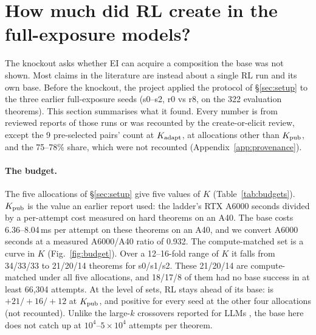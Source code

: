\section{How much did RL create in the full-exposure models?}
\label{sec:case}

The knockout asks whether EI can acquire a composition the base was not shown. Most claims in the literature are
instead about a single RL run and its own base. Before the knockout, the project applied the protocol of
\S\ref{sec:setup} to the three earlier full-exposure seeds (s0--s2, r0 vs r8, on the 322 evaluation theorems). This
section summarises what it found. Every number is from reviewed reports of those runs or was recounted by the
create-or-elicit review, except the 9 pre-selected pairs' count at $K_{\mathrm{adapt}}$, \dcov{} at allocations other than
$K_{\mathrm{pub}}$, and the 75--78\% share, which were not recounted (Appendix~\ref{app:provenance}).

\paragraph{The budget.} The five allocations of \S\ref{sec:setup} give five values of $K$ (Table~\ref{tab:budgets}).
$K_{\mathrm{pub}}$ is the value an earlier report used: the ladder's RTX A6000 seconds divided by a per-attempt cost measured on
hard theorems on an A40. The base costs 6.36--8.04\,ms per attempt on these theorems on an A40, and we convert A6000 seconds at a
measured A6000/A40 ratio of 0.932. The compute-matched set is a curve in $K$ (Fig.~\ref{fig:budget}). Over a 12--16-fold
range of $K$ it falls from 34/33/33 to 21/20/14 theorems for s0/s1/s2. These 21/20/14 are compute-matched under all five
allocations, and 18/17/8 of them had no base success in at least 66,304 attempts. At the level of sets, RL stays ahead
of its base: \dcov{} is $+21/+16/+12$ at $K_{\mathrm{pub}}$, and positive for every seed at the other four allocations (not
recounted). Unlike the large-$k$ crossovers
reported for LLMs \citep{yue2025doesrl}, the base here does not catch up at $10^4$--$5\times10^4$ attempts per theorem.

